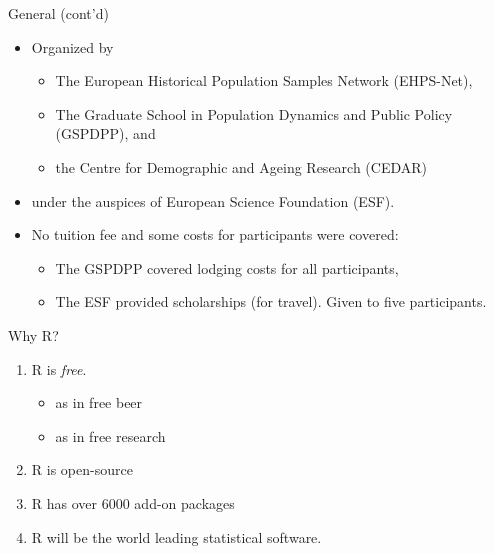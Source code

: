 \begin{frame}{General (cont'd)}

\begin{itemize}
\itemsep1pt\parskip0pt
\item
  Organized by

  \begin{itemize}
  \itemsep1pt\parskip0pt
  \item
    The European Historical Population Samples Network (EHPS-Net),
  \item
    The Graduate School in Population Dynamics and Public Policy
    (GSPDPP), and
  \item
    the Centre for Demographic and Ageing Research (CEDAR)
  \end{itemize}
\item
  under the auspices of European Science Foundation (ESF).
\item
  No tuition fee and some costs for participants were covered:

  \begin{itemize}
  \itemsep1pt\parskip0pt
  \item
    The GSPDPP covered lodging costs for all participants,
  \item
    The ESF provided scholarships (for travel). Given to five
    participants.
  \end{itemize}
\end{itemize}

\end{frame}

\begin{frame}{Why R?}

\begin{enumerate}
\def\labelenumi{\arabic{enumi}.}
\itemsep1pt\parskip0pt
\item
  R is \emph{free}.

  \begin{itemize}
  \itemsep1pt\parskip0pt
  \item
    as in free beer
  \item
    as in free research
  \end{itemize}
\item
  R is open-source
\item
  R has over 6000 add-on packages
\item
  R will be the world leading statistical software.
\end{enumerate}

\end{frame}

